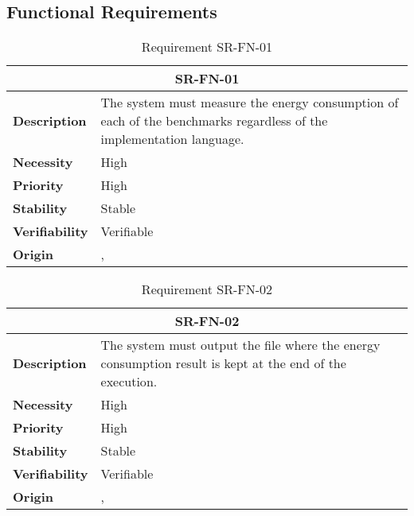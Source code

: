\subsection{Functional Requirements}

\begin{table}[H]
    \centering
    \begin{tabular}{l p{10cm}}
        \toprule
        \multicolumn{2}{c}{SR-FN-01} \\
        \toprule
        \textbf{Description}        &  The system must measure the energy consumption of each of the benchmarks regardless of the implementation language. \\
        \textbf{Necessity}          &  High \\
        \textbf{Priority}           &  High \\
        \textbf{Stability}          &  Stable \\
        \textbf{Verifiability}      & Verifiable \\
        \textbf{Origin}             & \textit{\nameref{tab:ur-ca-05}}, \textit{\nameref{tab:ur-ca-09}} \\
    \end{tabular}
    \caption{Requirement SR-FN-01}
    \label{tab:sr-fn-01}
\end{table}

\begin{table}[H]
    \centering
    \begin{tabular}{l p{10cm}}
        \toprule
        \multicolumn{2}{c}{SR-FN-02} \\
        \toprule
        \textbf{Description}        &  The system must output the file where the energy consumption result is kept at the end of the execution. \\
        \textbf{Necessity}          &  High \\
        \textbf{Priority}           &  High \\
        \textbf{Stability}          &  Stable \\
        \textbf{Verifiability}      & Verifiable \\
        \textbf{Origin}             & \textit{\nameref{tab:ur-ca-09}}, \textit{\nameref{tab:ur-ca-14}} \\
    \end{tabular}
    \caption{Requirement SR-FN-02}
    \label{tab:sr-fn-02}
\end{table}


